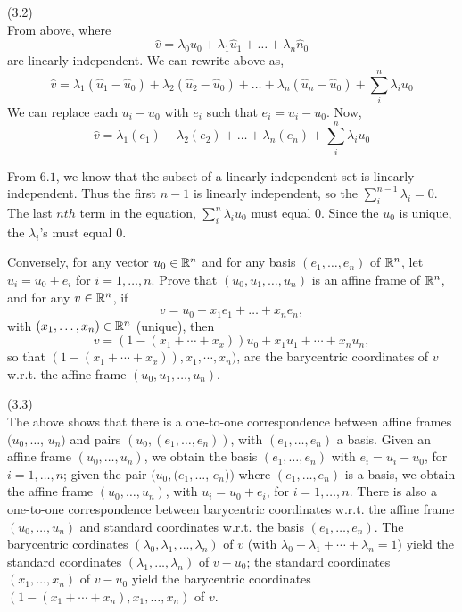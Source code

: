 \documentclass[12pt]{article}
\begin{document}
(3.2) \\
From above, where $$ \hat{v} = \lambda_0 \hat{u}_0 + \lambda_1 \hat{u}_1 + \ldots + \lambda_n \hat{n}_0$$ are linearly independent. We can rewrite above as, $$\hat{v} = \lambda_1(\hat{u}_1 - \hat{u}_0) + \lambda_2(\hat{u}_2 - \hat{u}_0) + \ldots + \lambda_n(\hat{u}_n - \hat{u}_0) + \sum_{i}^{n} \lambda_i u_0$$
We can replace each $u_i -  u_0$ with $e_i$ such that $e_i = u_i -  u_0$. Now, 
$$\hat{v} = \lambda_1(e_1) + \lambda_2(e_2) + \ldots + \lambda_n(e_n) + \sum_{i}^{n} \lambda_i u_0$$
 

From $6.1$, we know that the subset of a linearly independent set is linearly independent. Thus the first $n-1$ is linearly independent, so the $\sum_{i}^{n-1} \lambda_i = 0$. The last $nth$ term in the equation, $\sum_{i}^{n} \lambda_i u_0$ must equal 0. Since the $u_0$ is unique, the $\lambda_i$'s must equal 0. 
 


\medskip
Conversely, for any vector $u_0\in \mathbb{R}^n$ and for any basis
$(e_1, \ldots, e_n)$ of $\mathbb{R}^n$, let
$u_i = u_0 + e_i$ for $i = 1, \ldots, n$. Prove
that $(u_0, u_1, \ldots, u_n)$ is an affine frame of $\mathbb{R}^n$, 
and for any $v\in \mathbb{R}^n$, if  
\[
v = u_0 + x_1 e_1 + \dots + x_n e_n,
\]
with $(x_1, \ldots, x_n) \in \mathbb{R}^n$ (unique), then
\[
v = (1 - (x_1 + \cdots + x_x)) u_0 + x_1 u_1 + \cdots + x_n u_n,
\]
so that $(1 - (x_1 + \cdots + x_x)), x_1, \cdots,  x_n)$,
are the barycentric coordinates of $v$ w.r.t. the affine frame
$(u_0, u_1, \ldots, u_n)$.

(3.3) \\

\medskip
The above shows that there is a one-to-one correspondence between
affine frames $(u_0, \ldots$, $u_n)$ and pairs
$(u_0, (e_1, \ldots, e_n))$, with  $(e_1, \ldots, e_n)$  a basis.
Given  an affine frame  $(u_0, \ldots, u_n)$, we obtain the basis
$(e_1, \ldots, e_n)$ with $e_i = u_i - u_0$, for $i = 1, \ldots, n$;
given the pair $(u_0, (e_1, \ldots$, $e_n))$ where  $(e_1, \ldots, e_n)$
is a basis,  we obtain the affine frame   $(u_0, \ldots, u_n)$, with
$u_i = u_0 + e_i$, for $i = 1, \ldots, n$.
There is also a  one-to-one correspondence between
barycentric coordinates w.r.t. the affine frame
$(u_0, \ldots, u_n)$ and standard coordinates w.r.t.
the basis   $(e_1, \ldots, e_n)$.
The barycentric cordinates $(\lambda_0, \lambda_1, \ldots, \lambda_n)$
of $v$
(with $\lambda_0 + \lambda_1 + \cdots + \lambda_n = 1$) 
yield the standard coordinates $(\lambda_1, \ldots, \lambda_n)$ of $v - u_0$;
the standard coordinates $(x_1, \ldots, x_n)$ of $v - u_0$ yield the 
barycentric coordinates $(1 - (x_1 + \cdots + x_n ), x_1, \ldots,
x_n)$ of $v$.
\end{document}
